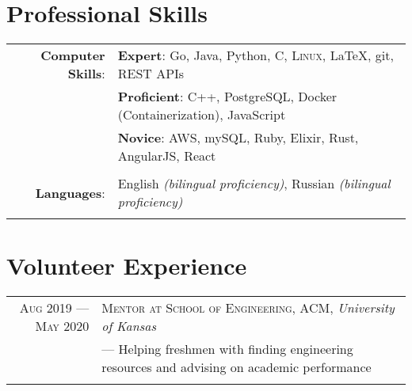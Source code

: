 \documentclass[a4paper, 10pt]{article}
\begin{document}
\section{Professional Skills}
\begin{tabular}{rl}
	\textbf{Computer Skills}: &
	\textbf{Expert}: Go, Java, Python, C, \textsc{Linux}, \LaTeX, git, REST APIs                               \\&
	\textbf{Proficient}: C++, PostgreSQL, Docker (Containerization), JavaScript                                \\&
	\textbf{Novice}: AWS, mySQL, Ruby, Elixir, Rust, AngularJS, React                                          \\\\

	\textbf{Languages}:       & English \emph{(bilingual proficiency)}, Russian \emph{(bilingual proficiency)} \\\\
\end{tabular}

\section{Volunteer Experience}
\begin{tabular}{r|p{12cm}}

	\textsc{Aug 2019 --- May 2020} & \textsc{Mentor at School of Engineering, ACM}, \emph{University of Kansas} \\&\footnotesize{
		--- Helping freshmen with finding engineering resources and advising on academic performance
	}                                                                                                           \\\multicolumn{2}{c}{}\\
\end{tabular}
\end{document}
